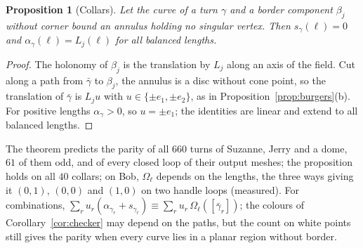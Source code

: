 \documentclass[11pt,a4paper]{article}
\newtheorem{proposition}{Proposition}
\newcommand{\shift}{s}
\newcommand{\lean}[1]{\texttt{\detokenize{#1}}}
\newenvironment{evidence}[3][]{}{}
\begin{document}
\begin{evidence}{core}{\lean{collar}; assumed: the holonomy of the turn is conjugate to that of the border component, and $\alpha_\gamma > 0$}
\begin{proposition}[Collars]\label{prop:collar}
Let the curve of a turn $\gamma$ and a border component $\beta_j$ without
corner bound an annulus holding no singular vertex. Then $\shift_\gamma(\ell)
= 0$ and $\alpha_\gamma(\ell) = L_j(\ell)$ for all balanced lengths.
\end{proposition}
\end{evidence}
\begin{proof}
The holonomy of $\beta_j$ is the translation by $L_j$ along an axis of the
field. Cut along a path from $\bar\gamma$ to $\beta_j$, the annulus is a disc
without cone point, so the translation of $\bar\gamma$ is $L_j u$ with $u \in
\{\pm e_1, \pm e_2\}$, as in Proposition~\ref{prop:burgers}(b). For positive
lengths $\alpha_\gamma > 0$, so $u = \pm e_1$; the identities are linear and
extend to all balanced lengths.
\end{proof}

The theorem predicts the parity of all $660$ turns of Suzanne, Jerry and a
dome, $61$ of them odd, and of every closed loop of their output meshes; the
proposition holds on all $40$ collars; on Bob,
$\Omega_\ell$ depends on the lengths, the three ways giving it $(0, 1)$, $(0,
0)$ and $(1, 0)$ on two handle loops (measured). For combinations,
$\sum_r u_r(\alpha_{\gamma_r} + \shift_{\gamma_r}) \equiv \sum_r u_r\,
\Omega_\ell([\bar\gamma_r])$; the colours of Corollary~\ref{cor:checker} may
depend on the paths, but the count on white points still gives the parity when
every curve lies in a planar region without border.
\end{document}
